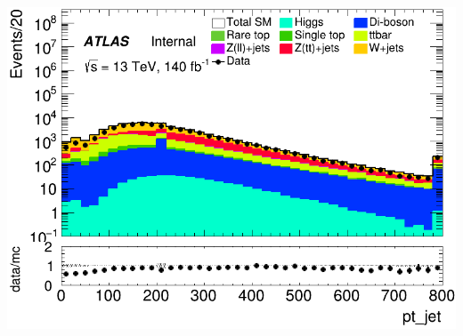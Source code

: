 \documentclass[usenames,dvipsnames]{beamer}
\begin{document}
\begin{frame}
    \hfill
    \begin{minipage}{0.32\textwidth}
        \centering
        \includegraphics[width=\textwidth]{graphics/LH_met/LH_met_pt_jet.png}
    \end{minipage}
    
    \vspace{0.5cm} %


\end{frame}
\end{document}

